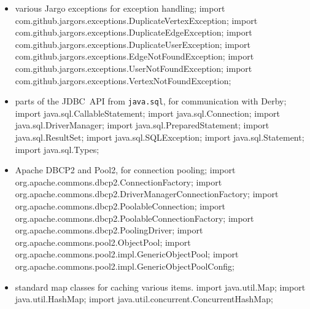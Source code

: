 \begin{itemize}
\item various Jargo exceptions for exception handling;
\nwenddocs{}\plusendmoddef
import com.github.jargors.exceptions.DuplicateVertexException;
import com.github.jargors.exceptions.DuplicateEdgeException;
import com.github.jargors.exceptions.DuplicateUserException;
import com.github.jargors.exceptions.EdgeNotFoundException;
import com.github.jargors.exceptions.UserNotFoundException;
import com.github.jargors.exceptions.VertexNotFoundException;
\nwendcode{}\item parts of the JDBC~API from {\tt{}java.sql}, for communication with Derby;
\nwenddocs{}\plusendmoddef
import java.sql.CallableStatement;   import java.sql.Connection;
import java.sql.DriverManager;       import java.sql.PreparedStatement;
import java.sql.ResultSet;           import java.sql.SQLException;
import java.sql.Statement;           import java.sql.Types;
\nwendcode{}\item Apache DBCP2 and Pool2, for connection pooling;
\nwenddocs{}\plusendmoddef
import org.apache.commons.dbcp2.ConnectionFactory;
import org.apache.commons.dbcp2.DriverManagerConnectionFactory;
import org.apache.commons.dbcp2.PoolableConnection;
import org.apache.commons.dbcp2.PoolableConnectionFactory;
import org.apache.commons.dbcp2.PoolingDriver;
import org.apache.commons.pool2.ObjectPool;
import org.apache.commons.pool2.impl.GenericObjectPool;
import org.apache.commons.pool2.impl.GenericObjectPoolConfig;
\nwendcode{}\item standard map classes for caching various items.
\nwenddocs{}\plusendmoddef
import java.util.Map;
import java.util.HashMap;
import java.util.concurrent.ConcurrentHashMap;
\nwendcode{}\nwdocspar
\end{itemize}

